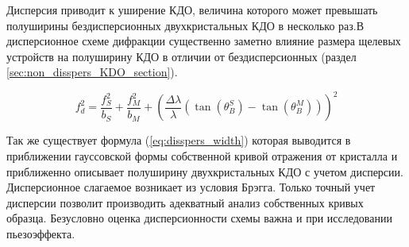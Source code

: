 Дисперсия приводит к уширение КДО, величина которого может превышать полуширины бездисперсионных
двухкристальных КДО в несколько раз.В дисперсионное схеме дифракции существенно заметно
влияние размера щелевых устройств на полуширину КДО в отличии от бездисперсионных (раздел \ref{sec:non_disspers_KDO_section}).

\begin{equation}
 f_d^2 = \frac{f_S^2}{b_S}+\frac{f_M^2}{b_M}+\left( \frac{\Delta \lambda}{\lambda} (\tan(\theta_B^S) - \tan(\theta_B^M)) \right)^2
 \label{eq:disspers_width}
\end{equation}

Так же существует формула (\ref{eq:disspers_width}) которая выводится в приближении
гауссовской формы собственной кривой отражения от кристалла и приближенно описывает полуширину двухкристальных КДО
с учетом дисперсии. Дисперсионное слагаемое возникает из условия Брэгга.
Только точный учет дисперсии позволит производить адекватный анализ собственных кривых образца. Безусловно оценка
дисперсионности схемы важна и при исследовании пьезоэффекта.

